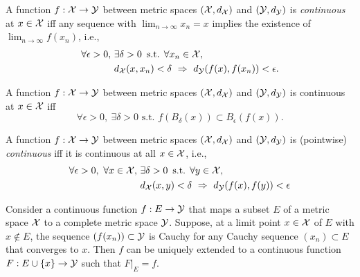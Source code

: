 \begin{defn}
  \label{def:continuousFuncPointMetricSpace}
  A function $f: {\cal X} \rightarrow {\cal Y}$
  between metric spaces $({\cal X},d_{\cal X})$
  and $({\cal Y}, d_{\cal Y})$
  is \emph{continuous} at $x\in{\cal X}$ iff 
  any sequence with $\lim_{n\rightarrow \infty}x_n = x$
  implies the existence of $\lim_{n\rightarrow \infty}f(x_n)$, 
  i.e., 
  \begin{align}
    \label{eq:continuousFuncPointMetricSpace}
    \forall \epsilon>0,\ &\exists \delta>0\, \text{ s.t. }
    \forall x_n \in {\cal X}, \ \
    \\ \nonumber
                         &d_{\cal X}(x,x_n)<\delta\ \Rightarrow\
                           d_{\cal Y}(f(x),f(x_n))<\epsilon. 
  \end{align}
\end{defn}


\begin{lem}
  \label{lem:pointContinuityBall}
  A function $f: {\cal X} \rightarrow {\cal Y}$
  between metric spaces $({\cal X},d_{\cal X})$
  and $({\cal Y}, d_{\cal Y})$
  is continuous at $x\in{\cal X}$ iff 
  \begin{equation}
    \label{eq:pointContinuityBall}
    \forall \epsilon > 0, \ \exists \delta>0 \text{ s.t. }
    f(B_{\delta}(x)) \subset B_{\epsilon}(f(x)).
  \end{equation}
\end{lem}

\begin{defn}
  \label{def:continuousFuncMetricSpace}
  A function $f: {\cal X} \rightarrow {\cal Y}$
  between metric spaces $({\cal X},d_{\cal X})$
  and $({\cal Y}, d_{\cal Y})$
  is (pointwise) \emph{continuous}
  iff it is continuous at all $x\in{\cal X}$,
  i.e., 
  \begin{align}
    \label{eq:continuousFuncMetricSpace}
    \forall \epsilon>0,\ \forall x\in {\cal X},\ 
    & \exists \delta>0\, \text{ s.t. }
    \forall y \in {\cal X},\ \
    \\ \nonumber
    &d_{\cal X}(x,y)<\delta\ \Rightarrow\ d_{\cal Y}(f(x),f(y))<\epsilon
  \end{align}
\end{defn}


\begin{thm}
  \label{thm:continuousExtPoint}
  Consider a continuous function $f: E \rightarrow {\cal Y}$ 
  that maps a subset $E$ of a metric space ${\cal X}$
  to a complete metric space ${\cal Y}$.
  Suppose, at a limit point $x\in {\cal X}$ of $E$ with $x\not\in E$, 
  the sequence $(f(x_n))\subset {\cal Y}$ is Cauchy
  for any Cauchy sequence $(x_n)\subset E$ that converges to $x$. 
  Then $f$ can be uniquely extended to a continuous function
  $F: E\cup\{x\}\rightarrow {\cal Y}$ such that
  $F|_{E} = f$.
\end{thm}

